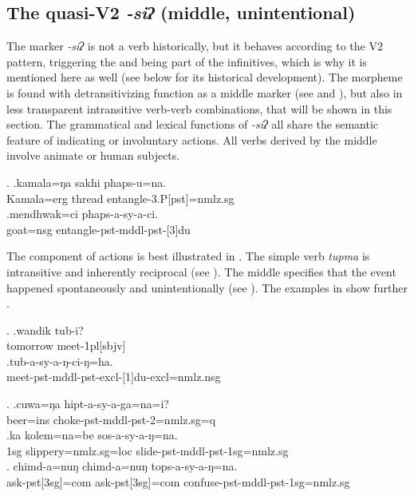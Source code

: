 \subsection{The quasi-V2 \emph{-siʔ} (middle, unintentional)}\label{V2-mddl}

The marker \emph{-siʔ} is not a verb historically, but it behaves according to the V2 pattern, triggering the  and being part of the infinitives, which is why it is mentioned here as well (see below for its historical development). The morpheme is found with detransitivizing function as a middle  marker (see \Next and ),  but also in less transparent intransitive verb-verb combinations, that will be shown in this section. The grammatical and lexical functions of  \emph{-siʔ} all share the semantic feature of indicating   or involuntary  actions. All verbs derived by the middle involve animate or human subjects.

\ex. \ag.kamala=ŋa sakhi phaps-u=na.\\
		Kamala{\sc =erg} thread entangle-{\sc 3.P[pst]=nmlz.sg}\\
 	\bg.mendhwak=ci phaps-a-sy-a-ci.\\
	goat{\sc =nsg} entangle-{\sc pst-mddl-pst-[3]du}\\
	
The component of  actions is best illustrated in \Next. The simple verb \emph{tupma}  is  intransitive and inherently reciprocal (see \Next[a]). The middle specifies that the event happened spontaneously and unintentionally (see \Next[b]). The examples in \NNext show further . 
	
\ex. \ag.wandik tub-i?\\
		tomorrow meet{\sc -1pl[sbjv]}\\
 	\bg.tub-a-sy-a-ŋ-ci-ŋ=ha.\\
		meet-{\sc pst-mddl-pst-excl-[1]du-excl=nmlz.nsg}\\
	
\ex. \ag.cuwa=ŋa hipt-a-sy-a-ga=na=i?\\
		beer{\sc =ins} choke-{\sc pst-mddl-pst-2=nmlz.sg=q}	\\
 	\bg.ka kolem=na=be sos-a-sy-a-ŋ=na.\\
	{\sc 1sg} slippery={\sc nmlz.sg=loc} slide{\sc -pst-mddl-pst-1sg=nmlz.sg}  	\\
	\bg. chimd-a=nuŋ chimd-a=nuŋ tops-a-sy-a-ŋ=na.\\
	 ask-{\sc pst[3sg]=com} ask-{\sc pst[3sg]=com} confuse{\sc -pst-mddl-pst-1sg=nmlz.sg}\\


